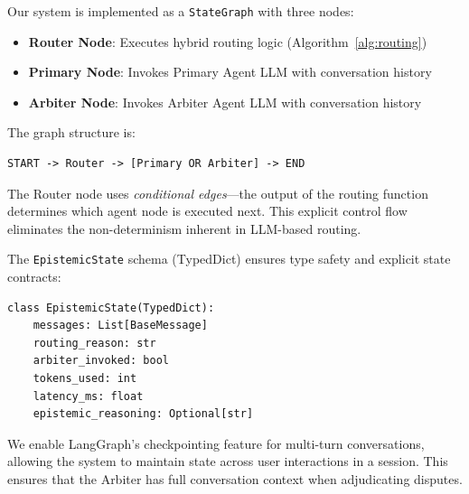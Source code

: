 Our system is implemented as a \texttt{StateGraph} with three nodes:

\begin{itemize}
    \item \textbf{Router Node}: Executes hybrid routing logic (Algorithm~\ref{alg:routing})
    \item \textbf{Primary Node}: Invokes Primary Agent LLM with conversation history
    \item \textbf{Arbiter Node}: Invokes Arbiter Agent LLM with conversation history
\end{itemize}

The graph structure is:
\begin{verbatim}
START -> Router -> [Primary OR Arbiter] -> END
\end{verbatim}

The Router node uses \textit{conditional edges}—the output of the routing function determines which agent node is executed next. This explicit control flow eliminates the non-determinism inherent in LLM-based routing.

The \texttt{EpistemicState} schema (TypedDict) ensures type safety and explicit state contracts:

\begin{verbatim}
class EpistemicState(TypedDict):
    messages: List[BaseMessage]
    routing_reason: str
    arbiter_invoked: bool
    tokens_used: int
    latency_ms: float
    epistemic_reasoning: Optional[str]
\end{verbatim}

We enable LangGraph's checkpointing feature for multi-turn conversations, allowing the system to maintain state across user interactions in a session. This ensures that the Arbiter has full conversation context when adjudicating disputes.